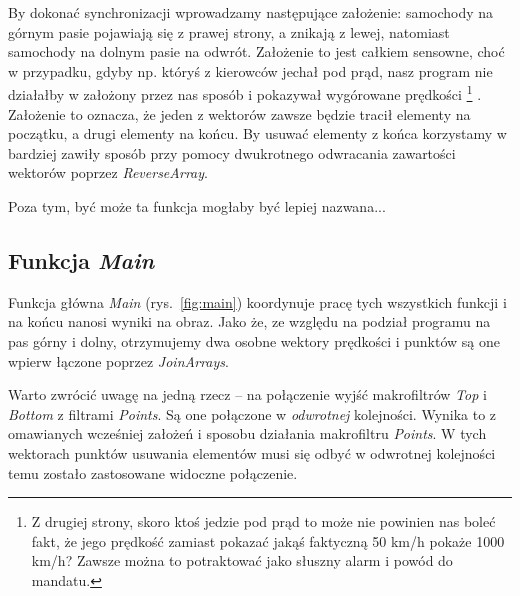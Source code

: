 \documentclass[11pt, a4paper]{article}
\begin{document}
By dokonać synchronizacji wprowadzamy następujące założenie: samochody na górnym pasie pojawiają się z prawej strony, a znikają z lewej, natomiast samochody na dolnym pasie na odwrót. Założenie to jest całkiem sensowne, choć w przypadku, gdyby np. któryś z kierowców jechał pod prąd, nasz program nie działałby w założony przez nas sposób i pokazywał wygórowane prędkości%
\footnote{Z drugiej strony, skoro ktoś jedzie pod prąd to może nie powinien nas boleć fakt, że jego prędkość
zamiast pokazać jakąś faktyczną 50 km/h pokaże 1000 km/h? Zawsze można to potraktować jako słuszny alarm i powód do mandatu.
}%
.
Założenie to oznacza, że jeden z wektorów zawsze będzie tracił elementy na początku, a drugi elementy na końcu. By usuwać elementy z końca korzystamy w bardziej zawiły sposób przy pomocy dwukrotnego odwracania zawartości wektorów poprzez \emph{ReverseArray}.

Poza tym, być może ta funkcja mogłaby być lepiej nazwana...

\subsection*{Funkcja \emph{Main}}

Funkcja główna \emph{Main} (rys.~\ref{fig:main}) koordynuje pracę tych wszystkich funkcji i na końcu nanosi wyniki na obraz. Jako że, ze względu na podział programu na pas górny i dolny, otrzymujemy dwa osobne wektory prędkości i punktów są one wpierw łączone poprzez \emph{JoinArrays}.

Warto zwrócić uwagę na jedną rzecz -- na połączenie wyjść makrofiltrów \emph{Top} i \emph{Bottom} z filtrami \emph{Points}. Są one połączone w \emph{odwrotnej} kolejności. Wynika to z omawianych wcześniej założeń i sposobu działania makrofiltru \emph{Points}. W tych wektorach punktów usuwania elementów musi się odbyć w odwrotnej kolejności temu zostało zastosowane widoczne połączenie.

\newcommand{\www}{0.48}
\end{document}
